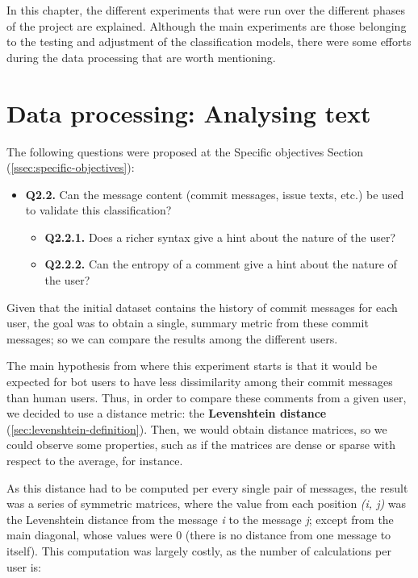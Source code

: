 \documentclass[a4paper, 12pt]{book}
\begin{document}
In this chapter, the different experiments that were run over the different phases of the project are explained. Although the main experiments are those belonging to the testing and adjustment of the classification models, there were some efforts during the data processing that are worth mentioning.

\section{Data processing: Analysing text}
\label{sec:exp-text-richness}

The following questions were proposed at the Specific objectives Section (\ref{ssec:specific-objectives}): 
\begin{itemize}
    \item \textbf{Q2.2.} Can the message content (commit messages, issue texts, etc.) be used to validate this classification?
    \begin{itemize}
        \item \textbf{Q2.2.1.} Does a richer syntax give a hint about the nature of the user? 
        \item \textbf{Q2.2.2.} Can the entropy of a comment give a hint about the nature of the user?
    \end{itemize}
\end{itemize}

Given that the initial dataset contains the history of commit messages for each user, the goal was to obtain a single, summary metric from these commit messages; so we can compare the results among the different users.

The main hypothesis from where this experiment starts is that it would be expected for bot users to have less dissimilarity among their commit messages than human users. Thus, in order to compare these comments from a given user, we decided to use a distance metric: the \textbf{Levenshtein distance} (\ref{sec:levenshtein-definition}). Then, we would obtain distance matrices, so we could observe some properties, such as if the matrices are dense or sparse with respect to the average, for instance.

As this distance had to be computed per every single pair of messages, the result was a series of symmetric matrices, where the value from each position \textit{(i, j)} was the Levenshtein distance from the message \textit{i} to the message \textit{j}; except from the main diagonal, whose values were $0$ (there is no distance from one message to itself). This computation was largely costly, as the number of calculations per user is:
\end{document}

